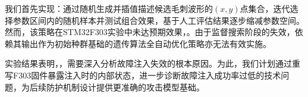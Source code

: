\documentclass{article}
\begin{document}
我们首先实现：通过随机生成并插值描述候选毛刺波形的$(x,y)$点集合，迭代选择参数区间内的随机样本并测试组合效果，基于人工评估结果逐步缩减参数空间。然而，该策略在STM32F303实验中未达预期效果，。由于监督搜索阶段的失效，依赖其输出作为初始种群基础的遗传算法全自动优化策略亦无法有效实施。

实验结果表明，，需要深入分析故障注入失效的根本原因。为此，我们计划通过重写F303固件暴露注入时的内部状态，进一步诊断故障注入成功率过低的技术问题，为后续防护机制设计提供更准确的攻击模型基础。

\end{document}
